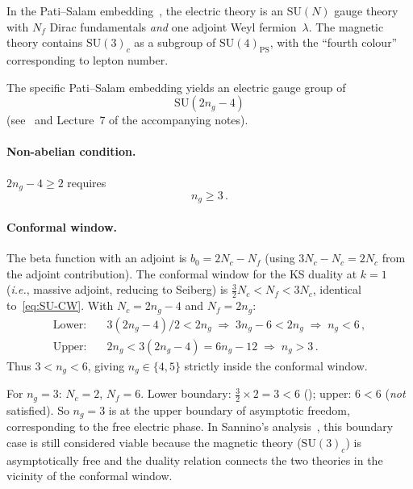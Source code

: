 \documentclass[11pt,a4paper]{article}
\theoremstyle{plain}
\theoremstyle{definition}
\theoremstyle{remark}
\newcommand{\Nc}{N_{\!c}}
\newcommand{\Nf}{N_{\!f}}
\newcommand{\ngen}{n_g}
\newcommand{\SU}[1]{\mathrm{SU}(#1)}
\newcommand{\ie}{\textit{i.e.}}
\begin{document}
In the Pati--Salam embedding~\cite{PS1974,CacciapagliaSannino2024}, the
electric theory is an $\SU{N}$ gauge theory with $\Nf$ Dirac
fundamentals \emph{and} one adjoint Weyl fermion~$\lambda$.  The
magnetic theory contains $\SU{3}_c$ as a subgroup of $\SU{4}_{\mathrm{PS}}$,
with the ``fourth colour'' corresponding to lepton number.

The specific Pati--Salam embedding yields an electric gauge group of
\begin{equation}\label{eq:PS-electric}
  \boxed{\SU{2\ngen - 4}}
\end{equation}
(see~\cite{CacciapagliaSannino2024} and Lecture~7 of the accompanying
notes).

\paragraph{Non-abelian condition.}
$2\ngen - 4 \geq 2$ requires
\begin{equation}\label{eq:PS-bound}
  \boxed{\ngen \geq 3}\,.
\end{equation}

\paragraph{Conformal window.}
The beta function with an adjoint is
$b_0 = 2\Nc - \Nf$ (using $3\Nc - \Nc = 2\Nc$ from the adjoint
contribution).  The conformal window for the KS duality at $k = 1$
(\ie, massive adjoint, reducing to Seiberg) is
$\frac{3}{2}\Nc < \Nf < 3\Nc$, identical to~\eqref{eq:SU-CW}.
With $\Nc = 2\ngen - 4$ and $\Nf = 2\ngen$:
\begin{align}
  \text{Lower:}&\quad 3(2\ngen - 4)/2 < 2\ngen
  \;\Longrightarrow\;
  3\ngen - 6 < 2\ngen
  \;\Longrightarrow\;
  \ngen < 6\,,
  \label{eq:PS-CW-lower} \\
  \text{Upper:}&\quad 2\ngen < 3(2\ngen - 4) = 6\ngen - 12
  \;\Longrightarrow\;
  \ngen > 3\,.
  \label{eq:PS-CW-upper}
\end{align}
Thus $3 < \ngen < 6$, giving $\ngen \in \{4, 5\}$ strictly inside the
conformal window.

For $\ngen = 3$: $\Nc = 2$, $\Nf = 6$.  Lower boundary:
$\frac{3}{2} \times 2 = 3 < 6$ (\checkmark); upper: $6 < 6$
(\emph{not} satisfied).  So $\ngen = 3$ is at the upper boundary of
asymptotic freedom, corresponding to the free electric phase.  In
Sannino's analysis~\cite{Sannino2011}, this boundary case is still
considered viable because the magnetic theory ($\SU{3}_c$) is
asymptotically free and the duality relation connects the two theories
in the vicinity of the conformal window.
\end{document}
